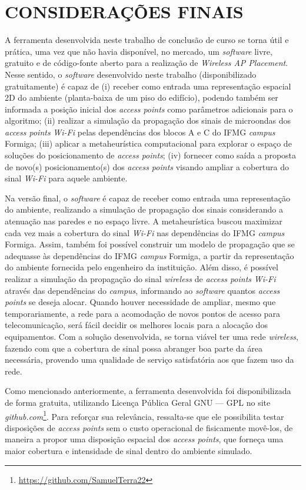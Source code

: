 \documentclass[
	12pt,				%
	twoside,			%
	a4paper,			%
	english,			%
	french,				%
	spanish,			%
	brazil				%
	]{abntex2}
\begin{document}
\chapter{CONSIDERAÇÕES FINAIS}\label{sec:consideracoes}

A ferramenta desenvolvida neste trabalho de conclusão de curso se torna
útil e prática, uma vez que não havia disponível, no mercado, um
\emph{software} livre, gratuito e de código-fonte aberto para a
realização de \emph{Wireless AP Placement}. Nesse sentido, o
\emph{software} desenvolvido neste trabalho (disponibilizado
gratuitamente) é capaz de (i) receber como entrada uma representação
espacial 2D do ambiente (planta-baixa de um piso do edifício), podendo
também ser informada a posição inicial dos \emph{access points} como
parâmetros adicionais para o algoritmo; (ii) realizar a simulação da
propagação dos sinais de microondas dos \emph{access points}
\emph{Wi-Fi} pelas dependências dos blocos A e C do IFMG \emph{campus}
Formiga; (iii) aplicar a metaheurística computacional para explorar o
espaço de soluções do posicionamento de \emph{access points}; (iv)
fornecer como saída a proposta de novo(s) posicionamento(s) dos
\emph{access points} visando ampliar a cobertura do sinal \emph{Wi-Fi}
para aquele ambiente.

Na versão final, o \emph{software} é capaz de receber como entrada uma
representação do ambiente, realizando a simulação de propagação dos
sinais considerando a atenuação nas paredes e no espaço livre. A
metaheurística buscou maximizar cada vez mais a cobertura do sinal
\emph{Wi-Fi} nas dependências do IFMG \emph{campus} Formiga. Assim,
também foi possível construir um modelo de propagação que se adequasse
às dependências do IFMG \emph{campus} Formiga, a partir da representação
do ambiente fornecida pelo engenheiro da instituição. Além disso, é
possível realizar a simulação da propagação do sinal \emph{wireless} de
\emph{access points} \emph{Wi-Fi} através das dependências do
\emph{campus}, informando ao \emph{software} quantos \emph{access
points} se deseja alocar. Quando houver necessidade de ampliar, mesmo
que temporariamente, a rede para a acomodação de novos pontos de acesso
para telecomunicação, será fácil decidir os melhores locais para a
alocação dos equipamentos. Com a solução desenvolvida, se torna viável
ter uma rede \emph{wireless}, fazendo com que a cobertura de sinal possa
abranger boa parte da área necessária, provendo uma qualidade de serviço
satisfatória aos que fazem uso da rede.

Como mencionado anteriormente, a ferramenta desenvolvida foi
disponibilizada de forma gratuita, utilizando Licença Pública Geral GNU
--- GPL no site \emph{github.com}\footnote{\url{https://github.com/SamuelTerra22}}.
Para reforçar sua relevância, ressalta-se que ele possibilita testar
disposições de \emph{access points} sem o custo operacional de
fisicamente movê-los, de maneira a propor uma disposição espacial dos
\emph{access points}, que forneça uma maior cobertura e intensidade de
sinal dentro do ambiente simulado.
\end{document}
